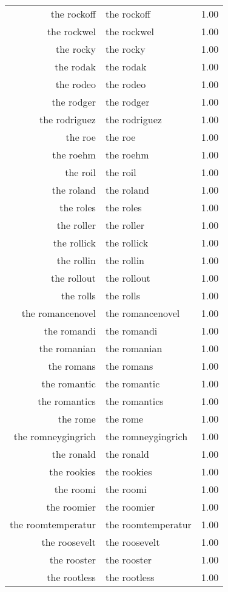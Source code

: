 \begin{table}[ht]
\begin{tabular}{rlr}
  the rockoff & the rockoff & 1.00 \\ 
  the rockwel & the rockwel & 1.00 \\ 
  the rocky & the rocky & 1.00 \\ 
  the rodak & the rodak & 1.00 \\ 
  the rodeo & the rodeo & 1.00 \\ 
  the rodger & the rodger & 1.00 \\ 
  the rodriguez & the rodriguez & 1.00 \\ 
  the roe & the roe & 1.00 \\ 
  the roehm & the roehm & 1.00 \\ 
  the roil & the roil & 1.00 \\ 
  the roland & the roland & 1.00 \\ 
  the roles & the roles & 1.00 \\ 
  the roller & the roller & 1.00 \\ 
  the rollick & the rollick & 1.00 \\ 
  the rollin & the rollin & 1.00 \\ 
  the rollout & the rollout & 1.00 \\ 
  the rolls & the rolls & 1.00 \\ 
  the romancenovel & the romancenovel & 1.00 \\ 
  the romandi & the romandi & 1.00 \\ 
  the romanian & the romanian & 1.00 \\ 
  the romans & the romans & 1.00 \\ 
  the romantic & the romantic & 1.00 \\ 
  the romantics & the romantics & 1.00 \\ 
  the rome & the rome & 1.00 \\ 
  the romneygingrich & the romneygingrich & 1.00 \\ 
  the ronald & the ronald & 1.00 \\ 
  the rookies & the rookies & 1.00 \\ 
  the roomi & the roomi & 1.00 \\ 
  the roomier & the roomier & 1.00 \\ 
  the roomtemperatur & the roomtemperatur & 1.00 \\ 
  the roosevelt & the roosevelt & 1.00 \\ 
  the rooster & the rooster & 1.00 \\ 
  the rootless & the rootless & 1.00 \\ 

\end{tabular}
\end{table}
